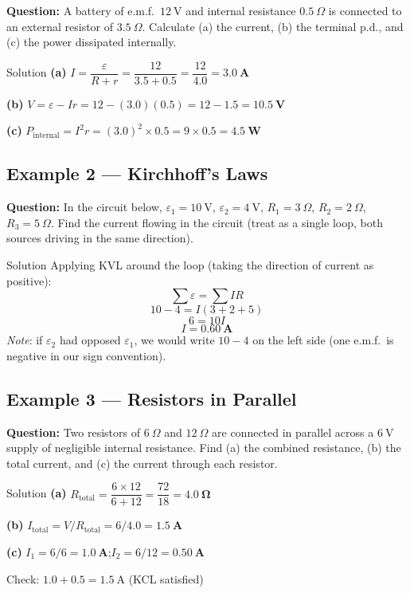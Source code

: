 \textbf{Question:} A battery of e.m.f.\ $12\ \text{V}$ and internal resistance $0.5\ \Omega$ is connected to an external resistor of $3.5\ \Omega$. Calculate (a) the current, (b) the terminal p.d., and (c) the power dissipated internally.

\begin{examplebox}{Solution}
\textbf{(a)} \quad $I = \dfrac{\varepsilon}{R + r} = \dfrac{12}{3.5 + 0.5} = \dfrac{12}{4.0} = \mathbf{3.0\ \text{A}}$

\vspace{0.3em}
\textbf{(b)} \quad $V = \varepsilon - Ir = 12 - (3.0)(0.5) = 12 - 1.5 = \mathbf{10.5\ \text{V}}$

\vspace{0.3em}
\textbf{(c)} \quad $P_{\text{internal}} = I^2 r = (3.0)^2 \times 0.5 = 9 \times 0.5 = \mathbf{4.5\ \text{W}}$
\end{examplebox}

\subsection*{Example 2 — Kirchhoff's Laws}

\textbf{Question:} In the circuit below, $\varepsilon_1 = 10\ \text{V}$, $\varepsilon_2 = 4\ \text{V}$, $R_1 = 3\ \Omega$, $R_2 = 2\ \Omega$, $R_3 = 5\ \Omega$. Find the current flowing in the circuit (treat as a single loop, both sources driving in the same direction).

\begin{examplebox}{Solution}
Applying KVL around the loop (taking the direction of current as positive):
$$\sum \varepsilon = \sum IR$$
$$10 - 4 = I(3 + 2 + 5)$$
$$6 = 10I$$
$$I = \mathbf{0.60\ \text{A}}$$
\textit{Note}: if $\varepsilon_2$ had opposed $\varepsilon_1$, we would write $10 - 4$ on the left side (one e.m.f.\ is negative in our sign convention).
\end{examplebox}

\subsection*{Example 3 — Resistors in Parallel}

\textbf{Question:} Two resistors of $6\ \Omega$ and $12\ \Omega$ are connected in parallel across a $6\ \text{V}$ supply of negligible internal resistance. Find (a) the combined resistance, (b) the total current, and (c) the current through each resistor.

\begin{examplebox}{Solution}
\textbf{(a)} \quad $R_{\text{total}} = \dfrac{6 \times 12}{6 + 12} = \dfrac{72}{18} = \mathbf{4.0\ \Omega}$

\vspace{0.3em}
\textbf{(b)} \quad $I_{\text{total}} = V/R_{\text{total}} = 6/4.0 = \mathbf{1.5\ \text{A}}$

\vspace{0.3em}
\textbf{(c)} \quad $I_1 = 6/6 = \mathbf{1.0\ \text{A}}$;\quad $I_2 = 6/12 = \mathbf{0.50\ \text{A}}$

Check: $1.0 + 0.5 = 1.5\ \text{A}$ \checkmark (KCL satisfied)
\end{examplebox}

